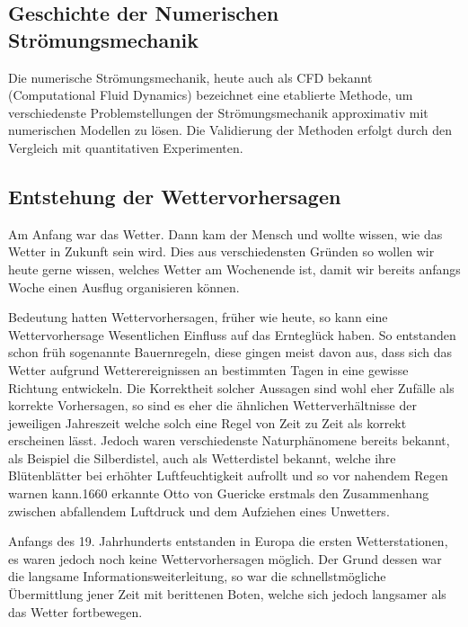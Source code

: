 \begin{refsection}
\section{Geschichte der Numerischen Strömungsmechanik
\label{klima:section:geschichte}}
Die numerische Strömungsmechanik, heute auch als CFD bekannt (Computational Fluid Dynamics) bezeichnet eine etablierte Methode, um verschiedenste Problemstellungen der Strömungsmechanik approximativ mit numerischen Modellen zu lösen. Die Validierung der Methoden erfolgt durch den Vergleich mit quantitativen Experimenten.

\subsection{Entstehung der Wettervorhersagen
\label{klima:subsection:wetter}}
Am Anfang war das Wetter. Dann kam der Mensch und wollte wissen, wie das Wetter in Zukunft sein wird. Dies aus verschiedensten Gründen so wollen wir heute gerne wissen, welches Wetter am Wochenende ist, damit wir bereits anfangs Woche einen Ausflug organisieren können.

Bedeutung hatten Wettervorhersagen, früher wie heute, so kann eine Wettervorhersage Wesentlichen Einfluss auf das Ernteglück haben. So entstanden schon früh sogenannte Bauernregeln, diese gingen meist davon aus, dass sich das Wetter aufgrund Wetterereignissen an bestimmten Tagen in eine gewisse Richtung entwickeln. Die Korrektheit solcher Aussagen sind wohl eher Zufälle als korrekte Vorhersagen, so sind es eher die ähnlichen Wetterverhältnisse der jeweiligen Jahreszeit welche solch eine Regel von Zeit zu Zeit als korrekt erscheinen lässt. Jedoch waren verschiedenste Naturphänomene bereits bekannt, als Beispiel die Silberdistel, auch als Wetterdistel bekannt, welche ihre Blütenblätter bei erhöhter Luftfeuchtigkeit aufrollt und so vor nahendem Regen warnen kann.1660 erkannte Otto von Guericke erstmals den Zusammenhang zwischen abfallendem Luftdruck und dem Aufziehen eines Unwetters.

Anfangs des 19. Jahrhunderts entstanden in Europa die ersten Wetterstationen, es waren jedoch noch keine Wettervorhersagen möglich. Der Grund dessen war die langsame Informationsweiterleitung, so war die schnellstmögliche Übermittlung jener Zeit mit berittenen Boten, welche sich jedoch langsamer als das Wetter fortbewegen.


\end{refsection}
